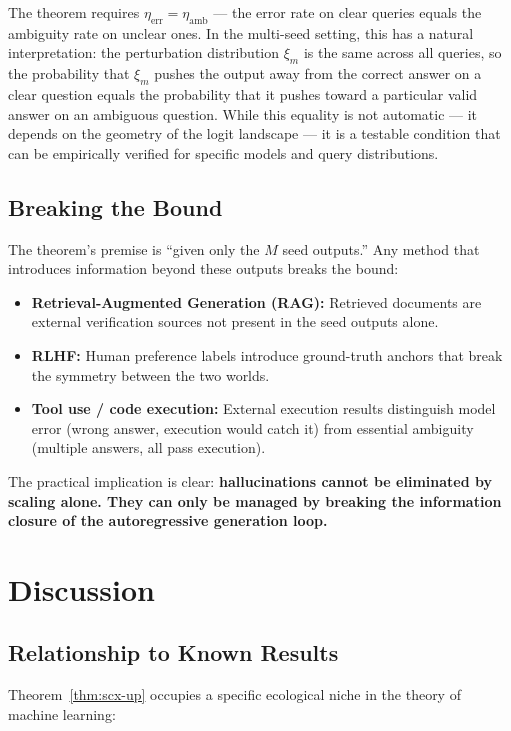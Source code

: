 \documentclass[12pt,a4paper]{ctexart}
\theoremstyle{definition}
\theoremstyle{remark}
\begin{document}
The theorem requires $\eta_{\text{err}} = \eta_{\text{amb}}$ — the error rate on clear queries equals the ambiguity rate on unclear ones. In the multi-seed setting, this has a natural interpretation: the perturbation distribution $\xi_m$ is the same across all queries, so the probability that $\xi_m$ pushes the output away from the correct answer on a clear question equals the probability that it pushes toward a particular valid answer on an ambiguous question. While this equality is not automatic — it depends on the geometry of the logit landscape — it is a testable condition that can be empirically verified for specific models and query distributions.

\subsection{Breaking the Bound}

The theorem's premise is ``given only the $M$ seed outputs.'' Any method that introduces information beyond these outputs breaks the bound:

\begin{itemize}
\item \textbf{Retrieval-Augmented Generation (RAG):} Retrieved documents are external verification sources not present in the seed outputs alone.
\item \textbf{RLHF:} Human preference labels introduce ground-truth anchors that break the symmetry between the two worlds.
\item \textbf{Tool use / code execution:} External execution results distinguish model error (wrong answer, execution would catch it) from essential ambiguity (multiple answers, all pass execution).
\end{itemize}

The practical implication is clear: \textbf{hallucinations cannot be eliminated by scaling alone. They can only be managed by breaking the information closure of the autoregressive generation loop.}

\section{Discussion}

\subsection{Relationship to Known Results}

Theorem~\ref{thm:scx-up} occupies a specific ecological niche in the theory of machine learning:
\end{document}
